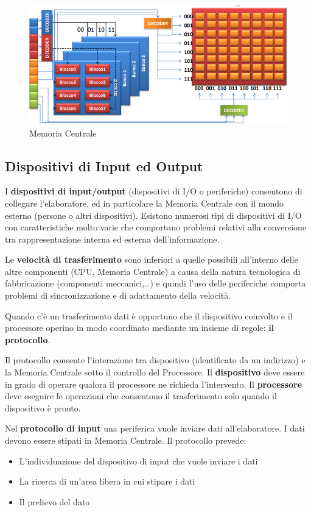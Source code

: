 \documentclass[12pt]{article}
\begin{document}
\begin{figure}[h]
    \centering
    \includegraphics[width=0.75\linewidth]{Memoria Centrale.png}
    \caption{Memoria Centrale} 
    \label{fig:enter-label}
\end{figure}
\newpage
\subsection{Dispositivi di Input ed Output}
I \textbf{dispositivi di input/output} (dispositivi di I/O o periferiche) consentono di collegare l’elaboratore, ed in particolare la Memoria Centrale con il mondo esterno (persone o altri dispositivi). Esistono numerosi tipi di dispositivi di I/O con caratteristiche molto varie che comportano problemi relativi alla conversione tra rappresentazione interna ed esterna dell’informazione.\par\medskip\noindent
Le \textbf{velocità di trasferimento} sono inferiori a quelle possibili all’interno delle altre componenti (CPU, Memoria Centrale) a causa della natura tecnologica di fabbricazione (componenti meccanici,…) e quindi l’uso delle periferiche comporta problemi di sincronizzazione e di adattamento della velocità.\par\medskip\noindent
Quando c’è un trasferimento dati è opportuno che il dispositivo coinvolto e il processore operino in modo coordinato mediante un insieme di regole: \textbf{il protocollo}.\par\medskip\noindent
Il protocollo consente l’interazione tra dispositivo (identificato da un indirizzo) e la Memoria Centrale sotto il controllo del Processore. Il \textbf{dispositivo} deve essere in grado di operare qualora il processore ne richieda l’intervento. Il \textbf{processore} deve eseguire le operazioni che consentono il trasferimento solo quando il dispositivo è pronto.\par\medskip\noindent
Nel\textbf{ protocollo di input} una periferica vuole inviare dati all’elaboratore. I dati devono essere stipati in Memoria Centrale.
Il protocollo prevede:
\begin{itemize}
    \item  L’individuazione del dispositivo di input che vuole inviare i dati
    \item  La ricerca di un’area libera in cui stipare i dati
    \item  Il prelievo del dato 
\end{itemize}
\end{document}
